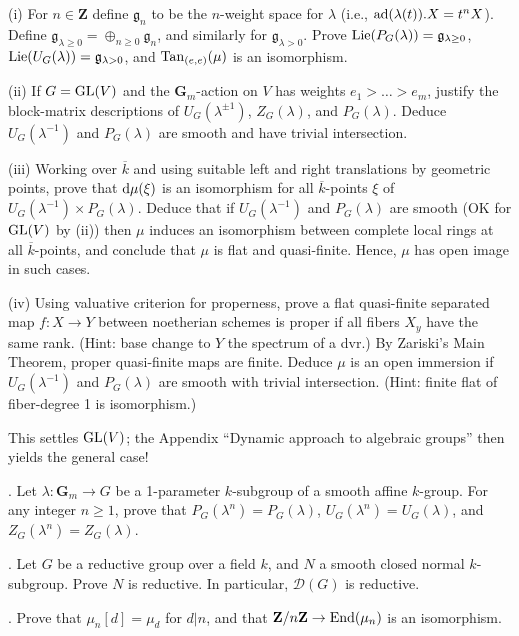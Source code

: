 \documentclass[10pt]{amsart}
\begin{document}
 (i) For $n \in \mathbf{Z}$ define
$\mathfrak{g}_n$ to be the $n$-weight space for $\lambda$
(i.e., ${\rm{ad}}(\lambda(t)).X = t^n X$). Define $\mathfrak{g}_{\lambda \ge 0} = \oplus_{n \ge 0}
 \mathfrak{g}_n$, and similarly for $\mathfrak{g}_{\lambda > 0}$.
 Prove ${\rm{Lie}}(P_G(\lambda)) = \mathfrak{g}_{\lambda \ge 0}$,
 ${\rm{Lie}}(U_G(\lambda)) = \mathfrak{g}_{\lambda > 0}$, and 
${\rm{Tan}}_{(e,e)}(\mu)$ is an isomorphism.
 
   (ii) If $G = {\rm{GL}}(V)$ and 
 the $\mathbf{G}_m$-action on $V$ has weights $e_1 > \dots > e_m$, justify the block-matrix
descriptions of $U_G(\lambda^{\pm 1})$, $Z_G(\lambda)$, and $P_G(\lambda)$.
Deduce $U_G(\lambda^{-1})$ and $P_G(\lambda)$ are smooth and have trivial
intersection.  

 (iii) Working over $\overline{k}$ and using suitable left and right translations by geometric points,
 prove that ${\rm{d}}\mu(\xi)$ is an isomorphism for all $\overline{k}$-points
 $\xi$ of $U_G(\lambda^{-1}) \times P_G(\lambda)$.  Deduce
 that if $U_G(\lambda^{-1})$ and $P_G(\lambda)$ are smooth (OK for ${\rm{GL}}(V)$ by (ii)) 
 then $\mu$ induces an isomorphism between complete
 local rings at all $\overline{k}$-points, and conclude that
  $\mu$ is flat and quasi-finite.  Hence, $\mu$ has open image in such cases.
  
  (iv) Using valuative criterion for properness, prove 
  a flat quasi-finite separated map $f:X \rightarrow Y$ between noetherian schemes is proper if all 
  fibers $X_y$ have the same rank. (Hint: base change to $Y$ the 
  spectrum of a dvr.)  By Zariski's Main Theorem, proper quasi-finite maps
  are finite.  Deduce $\mu$ is an open immersion if $U_G(\lambda^{-1})$ and 
$P_G(\lambda)$ are smooth with trivial intersection. 
(Hint: finite flat of fiber-degree 1 is isomorphism.)  

This settles
${\rm{GL}}(V)$; the Appendix ``Dynamic approach to algebraic groups'' 
then yields the general case! 
  
\medskip{}.  Let $\lambda:\mathbf{G}_m \rightarrow G$ be a 1-parameter $k$-subgroup of a smooth affine $k$-group.  For any integer $n \ge 1$, prove that $P_G(\lambda^n) = P_G(\lambda)$,
$U_G(\lambda^n) = U_G(\lambda)$, and $Z_G(\lambda^n) = Z_G(\lambda)$.

\medskip{}. Let $G$ be a reductive group over a field $k$, and $N$ a smooth closed normal $k$-subgroup.
Prove $N$ is reductive.  In particular, $\mathcal{D}(G)$ is reductive. 

\medskip{}.  Prove that $\mu_n[d] = \mu_d$ for $d|n$, and that 
$\mathbf{Z}/n\mathbf{Z} \rightarrow {\rm{End}}(\mu_n)$ is an isomorphism. 
  
\end{document}
